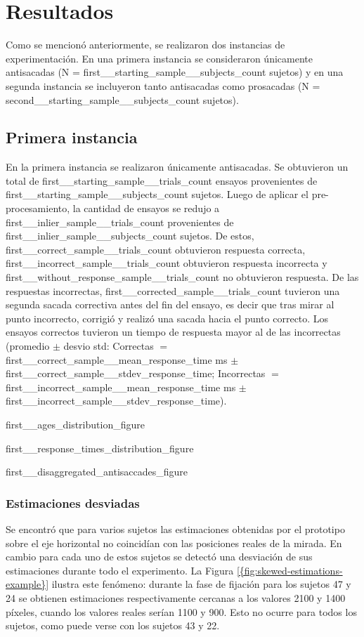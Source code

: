 \section{{Resultados}}

Como se mencionó anteriormente, se realizaron dos instancias de experimentación.
En una primera instancia se consideraron únicamente antisacadas (N =
{first__starting_sample__subjects_count} sujetos) y en una segunda
instancia se incluyeron tanto antisacadas como prosacadas (N =
{second__starting_sample__subjects_count} sujetos).

\subsection{{Primera instancia}}

En la primera instancia se realizaron únicamente antisacadas. Se obtuvieron un
total de {first__starting_sample__trials_count} ensayos provenientes de
{first__starting_sample__subjects_count} sujetos.
Luego de aplicar el pre-procesamiento, la cantidad de ensayos se redujo a
{first__inlier_sample__trials_count} provenientes de
{first__inlier_sample__subjects_count} sujetos.
De estos, {first__correct_sample__trials_count} obtuvieron respuesta correcta,
{first__incorrect_sample__trials_count} obtuvieron respuesta incorrecta y
{first__without_response_sample__trials_count} no obtuvieron respuesta.
De las respuestas incorrectas, {first__corrected_sample__trials_count} tuvieron
una segunda sacada correctiva antes del fin del ensayo, es decir que tras mirar
al punto incorrecto, corrigió y realizó una sacada hacia el punto correcto.
Los ensayos correctos tuvieron un tiempo de respuesta mayor al de las
incorrectas (promedio $\pm$ desvio std: Correctas $=$ 
{first__correct_sample__mean_response_time} ms $\pm$ 
{first__correct_sample__stdev_response_time}; Incorrectas $=$
{first__incorrect_sample__mean_response_time} ms $\pm$
{first__incorrect_sample__stdev_response_time}).

{first__ages_distribution_figure}

{first__response_times_distribution_figure}

{first__disaggregated_antisaccades_figure}

\subsubsection{{Estimaciones desviadas}} \label{{section:skewed-estimates}}

Se encontró que para varios sujetos las estimaciones obtenidas por el prototipo
sobre el eje horizontal no coincidían con las posiciones reales de la mirada.
En cambio para cada uno de estos sujetos se detectó una desviación de sus
estimaciones durante todo el experimento.
La Figura \ref{{fig:skewed-estimations-example}} ilustra este fenómeno:
durante la fase de fijación para los sujetos 47 y 24 se obtienen estimaciones
respectivamente cercanas a los valores 2100 y 1400 píxeles, cuando los valores
reales serían 1100 y 900.
Esto no ocurre para todos los sujetos, como puede verse con los sujetos 43 y 22.

